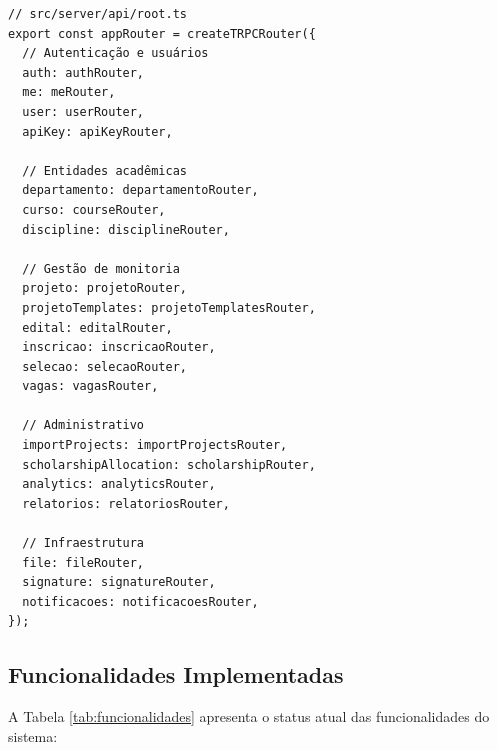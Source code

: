 \documentclass[portuguese]{sbc2025}%
\begin{document}
\begin{verbatim}
// src/server/api/root.ts
export const appRouter = createTRPCRouter({
  // Autenticação e usuários
  auth: authRouter,
  me: meRouter,
  user: userRouter,
  apiKey: apiKeyRouter,

  // Entidades acadêmicas
  departamento: departamentoRouter,
  curso: courseRouter,
  discipline: disciplineRouter,

  // Gestão de monitoria
  projeto: projetoRouter,
  projetoTemplates: projetoTemplatesRouter,
  edital: editalRouter,
  inscricao: inscricaoRouter,
  selecao: selecaoRouter,
  vagas: vagasRouter,

  // Administrativo
  importProjects: importProjectsRouter,
  scholarshipAllocation: scholarshipRouter,
  analytics: analyticsRouter,
  relatorios: relatoriosRouter,

  // Infraestrutura
  file: fileRouter,
  signature: signatureRouter,
  notificacoes: notificacoesRouter,
});
\end{verbatim}

\subsection{Funcionalidades Implementadas}

A Tabela \ref{tab:funcionalidades} apresenta o status atual das funcionalidades do sistema:
\end{document}
